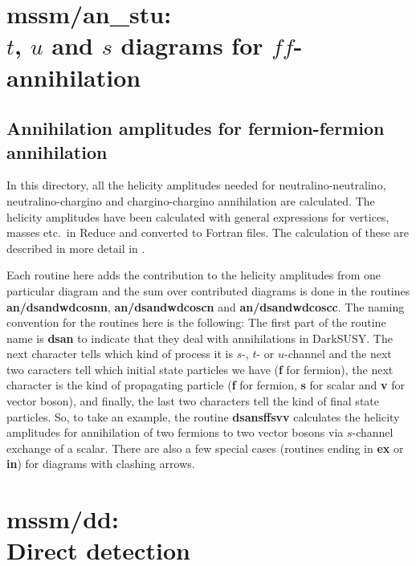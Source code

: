 \documentclass[a4paper,10pt,oneside]{book}
\newcommand{\code}[1]{\ft{#1}}
\newcommand{\codeb}[1]{\ftb{#1}}
\newcommand{\ds}{{\sffamily DarkSUSY}}
\newcommand{\ft}[1]{\textsf{#1}}
\newcommand{\ftb}[1]{{\bfseries \sffamily #1}}
\begin{document}
\section[mssm/an\_stu: $t$, $u$ and $s$ diagrams for $ff$-annihilation]{\codeb{mssm/an\_stu}:\\ $t$, $u$ and $s$ diagrams for $ff$-annihilation}
\label{sec:src_models/mssm/an_stu}


\subsection{Annihilation amplitudes for fermion-fermion annihilation}

In this directory, all the helicity amplitudes needed for
neutralino-neutralino, neutralino-chargino and chargino-chargino
annihilation are calculated. The helicity amplitudes have been
calculated with general expressions for vertices, masses etc.\ in
\code{Reduce} and converted to Fortran files. The calculation of these
are described in more detail in \cite{Edsjo:1997bg}.

Each routine here adds the contribution to the helicity amplitudes
from one particular diagram and the sum over contributed diagrams is
done in the routines \codeb{an/dsandwdcosnn}, \codeb{an/dsandwdcoscn}
and \codeb{an/dsandwdcoscc}. The naming convention for the routines
here is the following: The first part of the routine name is
\codeb{dsan} to indicate that they deal with annihilations in \ds. The
next character tells which kind of process it is $s$-, $t$- or
$u$-channel and the next two caracters tell which initial state
particles we have (\codeb{f} for fermion), the next character is the
kind of propagating particle (\codeb{f} for fermion, \codeb{s} for
scalar and \codeb{v} for vector boson), and finally, the last two
characters tell the kind of final state particles. So, to take an
example, the routine \codeb{dsansffsvv} calculates the helicity
amplitudes for annihilation of two fermions to two vector
bosons via $s$-channel exchange of a scalar. There are also a few
special cases (routines ending in \codeb{ex} or \codeb{in}) for
diagrams with clashing arrows.

\section[mssm/dd: Direct detection]{\codeb{mssm/dd}:\\ Direct detection}
\label{sec:src_models/mssm/dd}
\end{document}
